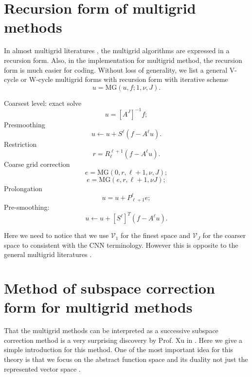 \section{Recursion form of multigrid methods}
In almost multigrid literatures \cite{trottenberg2000multigrid, briggs2000a}, 
the multigrid algorithms are expressed in a recursion form. Also, in the implementation
for multigrid method, the recursion form is much easier for coding. 
Without loss of generality, we list a general V-cycle or W-cycle multigrid forms
with recursion form with iterative scheme
$$
u = {\text{MG}}(u, f; 1, \nu, J).
$$
\begin{breakablealgorithm}%
	\caption{$ u = {\text{MG}}(u, f; \ell, \nu, J)$}
	\label{alg:MG}
	\begin{algorithmic}
		\State Coarsest level: exact solve
		$$
		u = [A^J]^{-1} f;
		$$
		\EndIf
		\State Presmoothing
		\State
		$$
		u \leftarrow u + S^{\ell} (f - A^\ell u).
		$$
		\EndFor
		\State Restriction
		$$
		r = R_\ell^{\ell+1} (f - A^\ell u).
		$$
		\State Coarse grid correction
		$$
		e = \text{MG}(0,r, \ell+1, \nu, J);
		$$
		\State
		$$
		e = \text{MG}(e, r, \ell+1,\nu J); 
		$$
		\EndIf
		\State Prolongation
		$$
		u=u+P_{\ell+1}^\ell e;
		$$
		\State Pre-smoothing:
		\State
		\begin{equation}\label{eq:smoothing}
		u \leftarrow u + [S^{\ell}]^T (f - A^\ell u).
		\end{equation}
		\EndFor
	\end{algorithmic}
\end{breakablealgorithm}

\begin{remark}
	Here we need to notice that we use $\mathcal V_1$ for the finest
	space and $\mathcal V_J$ for the coarser space to consistent
	with the CNN terminology. However this is opposite to the general 
	multigrid literatures \cite{xu1992iterative, xu2002method, 
		xu2016algebraic, trottenberg2000multigrid, briggs2000a}.
\end{remark}

\section{Method of subspace correction form for multigrid methods}
That the multigrid methods can be interpreted as a 
successive subspace correction method is a very surprising
discovery by Prof. Xu in \cite{xu1989theory, xu1992iterative}. 
Here we give a simple introduction for this method. 
One of the most important idea for this theory is that
we focus on the abstract function space and its duality not
just the represented vector space \cite{xu1992iterative, xu2017algebraic}.

